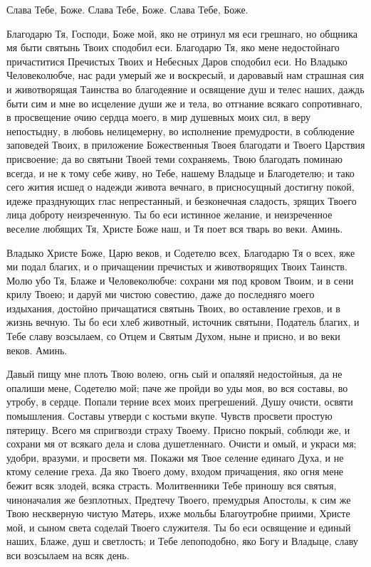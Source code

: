 \begin{mymulticols}

Слава Тебе, Боже. Слава Тебе, Боже. Слава Тебе, Боже.


Благодарю Тя, Господи, Боже мой, яко не отринул мя еси грешнаго, но общника мя быти святынь Твоих сподобил еси. Благодарю Тя, яко мене недостойнаго причаститися Пречистых Твоих и Небесных Даров сподобил еси. Но Владыко Человеколюбче, нас ради умерый же и воскресый, и даровавый нам страшная сия и животворящая Таинства во благодеяние и освящение душ и телес наших, даждь быти сим и мне во исцеление души же и тела, во отгнание всякаго сопротивнаго, в просвещение очию сердца моего, в мир душевных моих сил, в веру непостыдну, в любовь нелицемерну, во исполнение премудрости, в соблюдение заповедей Твоих, в приложение Божественныя Твоея благодати и Твоего Царствия присвоение; да во святыни Твоей теми сохраняемь, Твою благодать поминаю всегда, и не к тому себе живу, но Тебе, нашему Владыце и Благодетелю; и тако сего жития исшед о надежди живота вечнаго, в присносущный достигну покой, идеже празднующих глас непрестанный, и безконечная сладость, зрящих Твоего лица доброту неизреченную. Ты бо еси истинное желание, и неизреченное веселие любящих Тя, Христе Боже наш, и Тя поет вся тварь во веки. Аминь.


Владыко Христе Боже, Царю веков, и Содетелю всех, Благодарю Тя о всех, яже ми подал благих, и о причащении пречистых и животворящих Твоих Таинств. Молю убо Тя, Блаже и Человеколюбче: сохрани мя под кровом Твоим, и в сени крилу Твоею; и даруй ми чистою совестию, даже до последняго моего издыхания, достойно причащатися святынь Твоих, во оставление грехов, и в жизнь вечную. Ты бо еси хлеб животный, источник святыни, Податель благих, и Тебе славу возсылаем, со Отцем и Святым Духом, ныне и присно, и во веки веков. Аминь.


Давый пищу мне плоть Твою волею, огнь сый и опаляяй недостойныя, да не опалиши мене, Содетелю мой; паче же пройди во уды моя, во вся составы, во утробу, в сердце. Попали терние всех моих прегрешений. Душу очисти, освяти помышления. Составы утверди с костьми вкупе. Чувств просвети простую пятерицу. Всего мя спригвозди страху Твоему. Присно покрый, соблюди же, и сохрани мя от всякаго дела и слова душетленнаго. Очисти и омый, и украси мя; удобри, вразуми, и просвети мя. Покажи мя Твое селение единаго Духа, и не ктому селение греха. Да яко Твоего дому, входом причащения, яко огня мене бежит всяк злодей, всяка страсть. Молитвенники Тебе приношу вся святыя, чиноначалия же безплотных, Предтечу Твоего, премудрыя Апостолы, к сим же Твою нескверную чистую Матерь, ихже мольбы Благоутробне приими, Христе мой, и сыном света соделай Твоего служителя. Ты бо еси освящение и единый наших, Блаже, душ и светлость; и Тебе лепоподобно, яко Богу и Владыце, славу вси возсылаем на всяк день.


\end{mymulticols}
